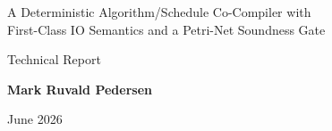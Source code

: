 \begin{titlingpage}
\centering
\vspace*{2cm}
{\Huge\bfseries \nuc\par}
\vspace{0.6cm}
{\Large A Deterministic Algorithm/Schedule Co-Compiler with\\[0.2em]
 First-Class IO Semantics and a Petri-Net Soundness Gate\par}
\vspace{0.8cm}
{\large Technical Report\par}
\vfill
{\large\bfseries Mark Ruvald Pedersen\par}
\vfill
{\large June 2026\par}
\end{titlingpage}
